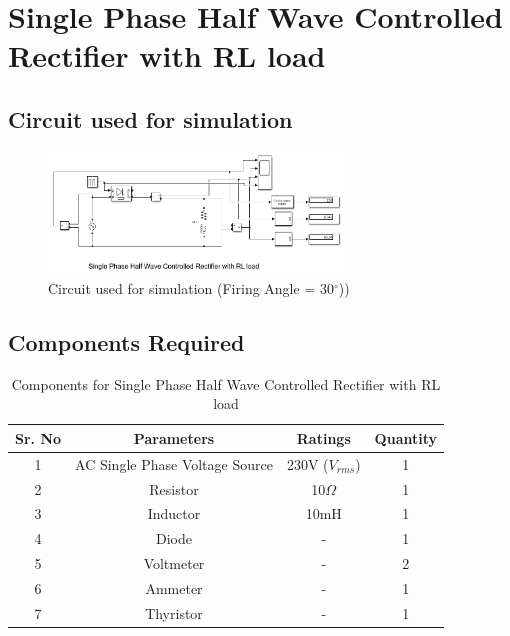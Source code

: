 \section{Single Phase Half Wave Controlled Rectifier with RL load}

\subsection{Circuit used for simulation}

\begin{figure}[h]
    \centering
    \includegraphics[width=0.7\textwidth]{images/experiment-1/circuit-diagram-simulation-06.png}
    \caption{Circuit used for simulation (Firing Angle = 30$ ^\circ $))}
    \label{Fig_simulation_circuit_single-phase-half-wave-controlled-rectifier-with-RL-load}
\end{figure}

\subsection{Components Required}

\begin{table}[h]
    \renewcommand{\arraystretch}{1.3}
    \label{table_components_required_circuit_6}
    \centering
    \begin{tabular}{|c|c|c|c|}
        \hline
        Sr. No & Parameters                     & Ratings            & Quantity \\
        \hline
        \hline
        1      & AC Single Phase Voltage Source & 230V ($ V_{rms} $) & 1        \\
        \hline
        2      & Resistor                       & 10$ \Omega $       & 1        \\
        \hline
        3      & Inductor                       & 10mH               & 1        \\
        \hline
        4      & Diode                          & -                  & 1        \\
        \hline
        5      & Voltmeter                      & -                  & 2        \\
        \hline
        6      & Ammeter                        & -                  & 1        \\
        \hline
        7      & Thyristor                      & -                  & 1        \\
        \hline
    \end{tabular}
    \caption{Components for Single Phase Half Wave Controlled Rectifier with RL load}

\end{table}




